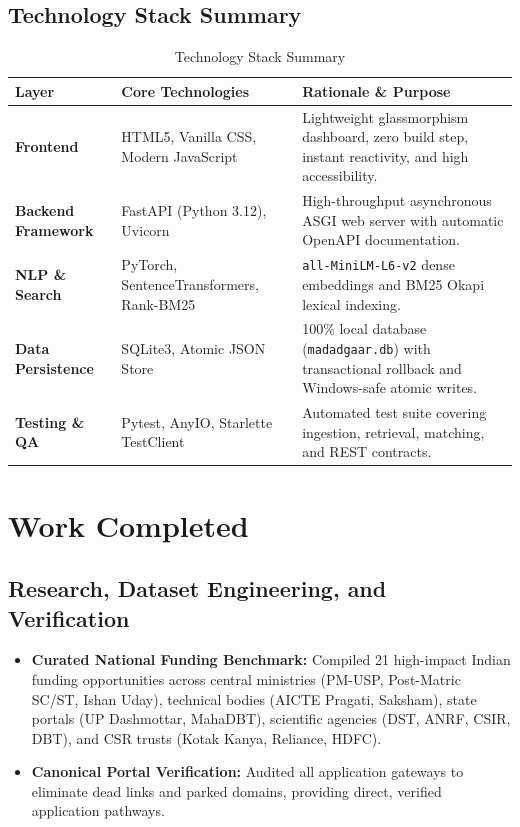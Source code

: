 \documentclass[12pt,a4paper]{article}
\begin{document}
\subsection{Technology Stack Summary}

\begin{table}[H]
    \centering
    \caption{Technology Stack Summary}
    \begin{tabularx}{\textwidth}{|l|p{4.5cm}|X|}
        \hline
        \textbf{Layer} & \textbf{Core Technologies} & \textbf{Rationale \& Purpose} \\
        \hline
        \textbf{Frontend} & HTML5, Vanilla CSS, Modern JavaScript & Lightweight glassmorphism dashboard, zero build step, instant reactivity, and high accessibility. \\
        \hline
        \textbf{Backend Framework} & FastAPI (Python 3.12), Uvicorn & High-throughput asynchronous ASGI web server with automatic OpenAPI documentation. \\
        \hline
        \textbf{NLP \& Search} & PyTorch, SentenceTransformers, Rank-BM25 & \texttt{all-MiniLM-L6-v2} dense embeddings and BM25 Okapi lexical indexing. \\
        \hline
        \textbf{Data Persistence} & SQLite3, Atomic JSON Store & 100\% local database (\texttt{madadgaar.db}) with transactional rollback and Windows-safe atomic writes. \\
        \hline
        \textbf{Testing \& QA} & Pytest, AnyIO, Starlette TestClient & Automated test suite covering ingestion, retrieval, matching, and REST contracts. \\
        \hline
    \end{tabularx}
\end{table}

\section{Work Completed}

\subsection{Research, Dataset Engineering, and Verification}
\begin{itemize}[itemsep=2pt]
    \item \textbf{Curated National Funding Benchmark:} Compiled 21 high-impact Indian funding opportunities across central ministries (PM-USP, Post-Matric SC/ST, Ishan Uday), technical bodies (AICTE Pragati, Saksham), state portals (UP Dashmottar, MahaDBT), scientific agencies (DST, ANRF, CSIR, DBT), and CSR trusts (Kotak Kanya, Reliance, HDFC).
    \item \textbf{Canonical Portal Verification:} Audited all application gateways to eliminate dead links and parked domains, providing direct, verified application pathways.
\end{itemize}
\end{document}
